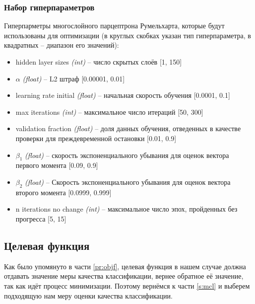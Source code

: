 \documentclass[times,specification,annotation]{itmo-student-thesis}
\begin{document}
		\subsubsection{Набор гиперпараметров}
		Гиперпарметры многослойного парцептрона Румельхарта, которые будут использованы для оптимизации (в круглых скобках указан тип гиперпараметра, в квадратных -- диапазон его значений):
		\begin{itemize}
			\item hidden layer sizes \textit{(int)} -- число скрытых слоёв [1, 150]
			\item $ \alpha $ \textit{(float)} -- L2 штраф [0.00001, 0.01]
			\item learning rate initial \textit{(float)} -- начальная скорость обучения [0.0001, 0.1]
			\item max iterations \textit{(int)} -- максимальное число итераций [50, 300]
			\item validation fraction \textit{(float)} -- доля данных обучения, отведенных в качестве проверки для преждевременной остановки [0.01, 0.9]
			\item $ \beta_{1} $ \textit{(float)} -- скорость экспоненциального убывания для оценок вектора первого момента [0.09, 0.9]
			\item $ \beta_{2} $ \textit{(float)} -- Скорость экспоненциального убывания для оценок вектора второго момента [0.0999, 0.999]
			\item n iterations no change \textit{(int)} -- максимальное число эпох, пройденных без прогресса [5, 15]
		\end{itemize}
		
		\subsection{Целевая функция}
		Как было упомянуто в части \ref{pr:objf}, целевая функция в нашем случае должна отдавать значение меры качества классификации, вернее обратное её значение, так как идёт процесс минимизации. Поэтому вернёмся к части \ref{s:mcl} и выберем подходящую нам меру оценки качества классификации.\par
\end{document}
